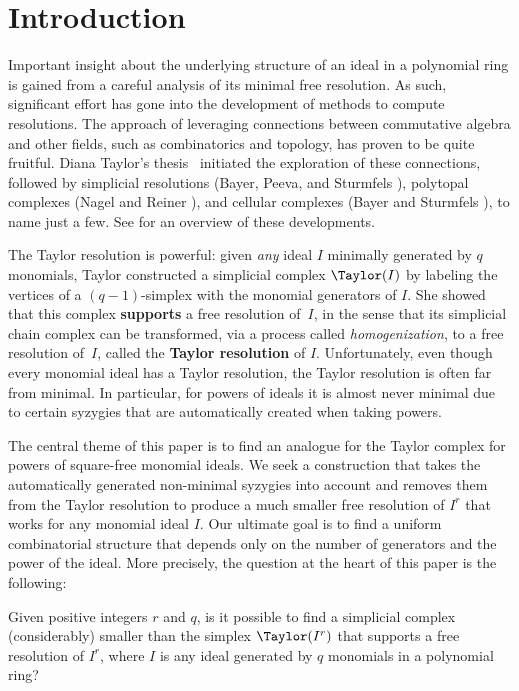 \section{Introduction}
\label{sec:introduction}

Important insight about the underlying structure of an ideal in a
polynomial ring is gained from a careful analysis of its minimal free
resolution.  As such, significant effort has gone into the development
of methods to compute resolutions.  The approach of leveraging
connections between commutative algebra and other fields, such as
combinatorics and topology, has proven to be quite fruitful.  Diana
Taylor's thesis~\cite{T} initiated the exploration of these
connections, followed by simplicial resolutions (Bayer, Peeva, and
Sturmfels \cite{BPS}), polytopal complexes (Nagel and Reiner
\cite{NR}), and cellular complexes (Bayer and Sturmfels \cite{BS}), to
name just a few. See \cite{MS,OW} for an overview of these developments.

The Taylor resolution is powerful: given \textit{any} ideal $I$
minimally generated by $q$ monomials, Taylor constructed a simplicial
complex $\Taylor(I)$ by labeling the vertices of a $(q-1)$-simplex with
the monomial generators of $I$. She showed that this complex {\bf
  supports} a free resolution of~$I$, in the sense that its simplicial
chain complex can be transformed, via a process called {\it
  homogenization}, to a free resolution of~$I$, called the {\bf Taylor
  resolution} of $I$.
Unfortunately, even though every monomial ideal has a Taylor
resolution, the Taylor resolution is often far from minimal.  In
particular, for powers of ideals it is almost never minimal due to certain syzygies that are automatically created when taking powers.

The central theme of this paper is to find an analogue for the Taylor
complex for powers of square-free monomial ideals.
We seek a construction that takes the automatically generated non-minimal syzygies 
into account and removes them from the Taylor resolution to produce a
much smaller free resolution of $I^r$ that works for any monomial ideal $I$. Our
ultimate goal is to find a uniform combinatorial structure that
depends only on the number of generators and the power of the ideal.
More precisely, the question at the heart of this paper is the
following:

\begin{question} Given positive integers $r$ and $q$, is it possible to
  find a simplicial complex \textup{(}considerably\textup{)} smaller than the simplex
  $\Taylor(I^r)$ that supports a free resolution of $I^r$, where $I$
  is any ideal generated by $q$ monomials in a polynomial ring?
\end{question}

